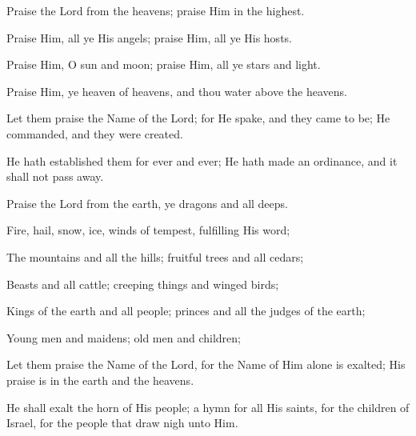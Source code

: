 Praise the Lord from the heavens; praise Him in the highest.

Praise Him, all ye His angels; praise Him, all ye His hosts.

Praise Him, O sun and moon; praise Him, all ye stars and light.

Praise Him, ye heaven of heavens, and thou water above the heavens.

Let them praise the Name of the Lord; for He spake, and they came to be; He commanded, and they were created.

He hath established them for ever and ever; He hath made an ordinance, and it shall not pass away.

Praise the Lord from the earth, ye dragons and all deeps.

Fire, hail, snow, ice, winds of tempest, fulfilling His word;

The mountains and all the hills; fruitful trees and all cedars;

Beasts and all cattle; creeping things and winged birds;

Kings of the earth and all people; princes and all the judges of the earth;

Young men and maidens; old men and children;

Let them praise the Name of the Lord, for the Name of Him alone is exalted; His praise is in the earth and the heavens.

He shall exalt the horn of His people; a hymn for all His saints, for the children of Israel, for the people that draw nigh unto Him.
